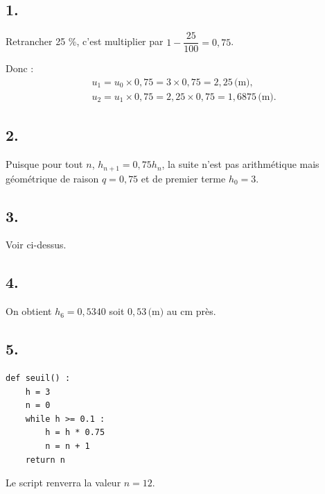 \subsection*{1.}

Retrancher 25 \%, c'est multiplier par \(1 - \dfrac{25}{100} = 0{,}75\).

Donc :
\begin{align*}
&u_1 = u_0 \times 0{,}75 = 3 \times 0{,}75 = 2{,}25 \, \text{(m)}, \\
&u_2 = u_1 \times 0{,}75 = 2{,}25 \times 0{,}75 = 1{,}6875 \, \text{(m)}.
\end{align*}

\subsection*{2.}

Puisque pour tout \(n\), \(h_{n+1} = 0{,}75 h_n\), la suite n'est pas arithmétique mais géométrique de raison \(q = 0{,}75\) et de premier terme \(h_0 = 3\).

\subsection*{3.}

Voir ci-dessus.

\subsection*{4.}

On obtient \(h_6 = 0{,}5340\) soit \(0{,}53 \, \text{(m)}\) au cm près.

\subsection*{5.}

\begin{center}
\begin{lstlisting}[style=python]
def seuil() :
    h = 3
    n = 0
    while h >= 0.1 :
        h = h * 0.75
        n = n + 1
    return n
\end{lstlisting}
\end{center}

Le script renverra la valeur \(n = 12\).
